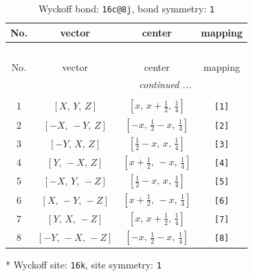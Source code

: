 \documentclass[fleqn,8pt]{jsarticle}
\begin{document}
\renewcommand{\arraystretch}{1.2}
\begin{longtable}{cccc}
\caption{Wyckoff bond: {\tt 16c@8j}, bond symmetry: {\tt 1}}
 \\
 \hline \hline
No. & vector & center & mapping \\ \hline \endfirsthead

\multicolumn{3}{l}{\tablename\ \thetable{}} \\
 \hline \hline
No. & vector & center & mapping \\ \hline \endhead

 \hline \hline
\multicolumn{3}{r}{\footnotesize\it continued ...} \\ \endfoot

 \hline \hline
\multicolumn{3}{r}{} \\ \endlastfoot

1 & $\left[ X,\, Y,\, Z \right]$ & $\left[ x,\, x + \frac{1}{2},\, \frac{1}{4} \right]$ & {\tt [1]} \\ \hline
2 & $\left[ - X,\, - Y,\, Z \right]$ & $\left[ - x,\, \frac{1}{2} - x,\, \frac{1}{4} \right]$ & {\tt [2]} \\ \hline
3 & $\left[ - Y,\, X,\, Z \right]$ & $\left[ \frac{1}{2} - x,\, x,\, \frac{1}{4} \right]$ & {\tt [3]} \\ \hline
4 & $\left[ Y,\, - X,\, Z \right]$ & $\left[ x + \frac{1}{2},\, - x,\, \frac{1}{4} \right]$ & {\tt [4]} \\ \hline
5 & $\left[ - X,\, Y,\, - Z \right]$ & $\left[ \frac{1}{2} - x,\, x,\, \frac{1}{4} \right]$ & {\tt [5]} \\ \hline
6 & $\left[ X,\, - Y,\, - Z \right]$ & $\left[ x + \frac{1}{2},\, - x,\, \frac{1}{4} \right]$ & {\tt [6]} \\ \hline
7 & $\left[ Y,\, X,\, - Z \right]$ & $\left[ x,\, x + \frac{1}{2},\, \frac{1}{4} \right]$ & {\tt [7]} \\ \hline
8 & $\left[ - Y,\, - X,\, - Z \right]$ & $\left[ - x,\, \frac{1}{2} - x,\, \frac{1}{4} \right]$ & {\tt [8]} \\
\end{longtable}
* Wyckoff site: {\tt 16k}, site symmetry: {\tt 1}
\renewcommand{\arraystretch}{1.2}
\end{document}
